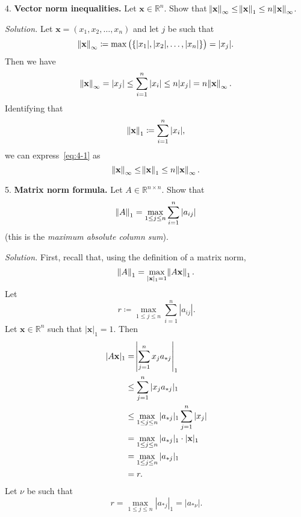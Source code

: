 \documentclass{article}
\def\*#1{\mathbf{#1}}
\newcommand{\R}{\mathbb{R}}
\begin{document}
\newpage

4. \textbf{Vector norm inequalities.}
Let $\*x \in \R^n$. Show that
$\enVert{\*x}_\infty \leq \enVert{\*x}_1 \leq n \enVert{\*x}_\infty$.

\textit{Solution.}
Let $\*x = (x_1, x_2, \ldots, x_n)$ and let $j$ be such that
%
\begin{equation*}
    \enVert{\*x}_\infty \coloneqq \max\del{\{|x_1|, |x_2|, \ldots, |x_n|\}} = |x_j|
    .
\end{equation*}
%
Then we have
%
\begin{equation}
    \enVert{\*x}_\infty = |x_j| \leq \sum_{i = 1}^n |x_i| \leq n |x_j| = n \enVert{\*x}_\infty
    \label{eq:4-1}
    .
\end{equation}
%
Identifying that
%
\begin{equation*}
    \enVert{\*x}_1 \coloneqq \sum_{i = 1}^n |x_i|
    ,
\end{equation*}
%
we can express~\eqref{eq:4-1} as
%
\begin{equation*}
    \enVert{\*x}_\infty \leq \enVert{\*x}_1 \leq n \enVert{\*x}_\infty
.
\end{equation*}

\newpage

5. \textbf{Matrix norm formula.}
Let $A \in \R^{n \times n}$. Show that
%
\begin{equation*}
    \enVert{A}_1 = \max_{1 \leq j \leq n} \sum_{i = 1}^n |a_{ij}|
\end{equation*}
%
(this is the \textit{maximum absolute column sum}).

\textit{Solution.}
First, recall that, using the definition of a matrix norm,
%
\begin{equation*}
    \enVert{A}_1 = \max_{|\*x|_1 = 1} \enVert{A \*x}_1
    .
\end{equation*}
%
Let
%
\begin{equation*}
    r \coloneqq \max_{1 \leq j \leq n} \sum_{i = 1}^n |a_{ij}|
    .
\end{equation*}
%
Let $\*x \in \R^n$ such that $|\*x|_1 = 1$. Then
%
\begin{align*}
    |A \*x|_1
        &= \envert{\sum_{j = 1}^n x_j a_{*j}}_1 \\
        &\leq \sum_{j = 1}^n |x_j a_{*j}|_1 \\
        &\leq \max_{1 \leq j \leq n} |a_{*j}|_1 \sum_{j = 1}^n |x_j| \\
        &= \max_{1 \leq j \leq n} |a_{*j}|_1 \cdot |\*x|_1 \\
        &= \max_{1 \leq j \leq n} |a_{*j}|_1 \\
        &= r
        .
\end{align*}
%
Let $\nu$ be such that
%
\begin{equation*}
    r = \max_{1 \leq j \leq n} |a_{*j}|_1 = |a_{* \nu}|
    .
\end{equation*}
\end{document}
